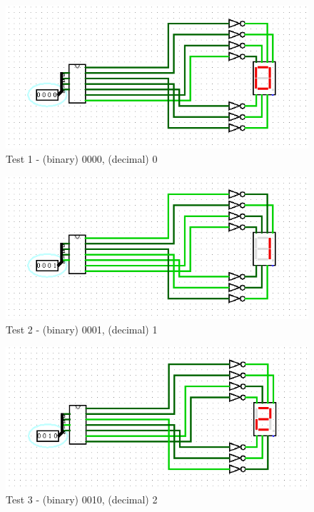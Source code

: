 \begin{figure}[h]
    \centering
    \includegraphics[width=\linewidth]{ScreenshotsTests/Comp 1/Comp 1_00009.png}
    \caption{Test 1 - (binary) 0000, (decimal) 0}
    \label{fig:test0}
\end{figure}

\begin{figure}[h]
    \centering
    \includegraphics[width=\linewidth]{ScreenshotsTests/Comp 1/Comp 1_00008.png}
    \caption{Test 2 - (binary) 0001, (decimal) 1}
    \label{fig:test1}
\end{figure}

\begin{figure}[h]
    \centering
    \includegraphics[width=\linewidth]{ScreenshotsTests/Comp 1/Comp 1_00007.png}
    \caption{Test 3 - (binary) 0010, (decimal) 2}
    \label{fig:test2}
\end{figure}

